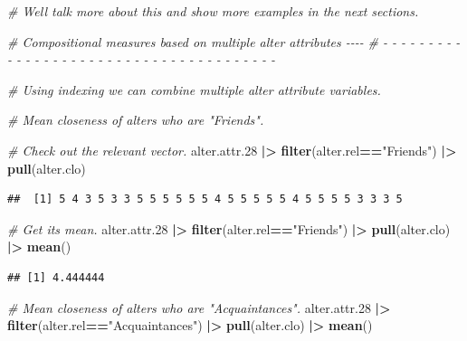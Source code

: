 \documentclass[
]{book}
\newenvironment{Shaded}{\begin{snugshade}}{\end{snugshade}}
\newcommand{\CommentTok}[1]{\textcolor[rgb]{0.56,0.35,0.01}{\textit{#1}}}
\newcommand{\FloatTok}[1]{\textcolor[rgb]{0.00,0.00,0.81}{#1}}
\newcommand{\FunctionTok}[1]{\textcolor[rgb]{0.13,0.29,0.53}{\textbf{#1}}}
\newcommand{\NormalTok}[1]{#1}
\newcommand{\SpecialCharTok}[1]{\textcolor[rgb]{0.81,0.36,0.00}{\textbf{#1}}}
\newcommand{\StringTok}[1]{\textcolor[rgb]{0.31,0.60,0.02}{#1}}
\begin{document}
\begin{Shaded}
\begin{Highlighting}[]
\CommentTok{\# We\textquotesingle{}ll talk more about this and show more examples in the next sections.}


\CommentTok{\# Compositional measures based on multiple alter attributes                 {-}{-}{-}{-}}
\CommentTok{\# {-} {-} {-} {-} {-} {-} {-} {-} {-} {-} {-} {-} {-} {-} {-} {-} {-} {-} {-} {-} {-} {-} {-} {-} {-} {-} {-} {-} {-} {-} {-} {-} {-} {-} {-} {-} {-} {-} {-} }

\CommentTok{\# Using indexing we can combine multiple alter attribute variables.}

\CommentTok{\# Mean closeness of alters who are "Friends".}

\CommentTok{\# Check out the relevant vector.}
\NormalTok{alter.attr}\FloatTok{.28} \SpecialCharTok{|\textgreater{}}
  \FunctionTok{filter}\NormalTok{(alter.rel}\SpecialCharTok{==}\StringTok{"Friends"}\NormalTok{) }\SpecialCharTok{|\textgreater{}}
  \FunctionTok{pull}\NormalTok{(alter.clo)}
\end{Highlighting}
\end{Shaded}

\begin{verbatim}
##  [1] 5 4 3 5 3 3 5 5 5 5 5 5 4 5 5 5 5 5 4 5 5 5 5 3 3 3 5
\end{verbatim}

\begin{Shaded}
\begin{Highlighting}[]
\CommentTok{\# Get its mean.}
\NormalTok{alter.attr}\FloatTok{.28} \SpecialCharTok{|\textgreater{}}
  \FunctionTok{filter}\NormalTok{(alter.rel}\SpecialCharTok{==}\StringTok{"Friends"}\NormalTok{) }\SpecialCharTok{|\textgreater{}}
  \FunctionTok{pull}\NormalTok{(alter.clo) }\SpecialCharTok{|\textgreater{}} 
  \FunctionTok{mean}\NormalTok{()}
\end{Highlighting}
\end{Shaded}

\begin{verbatim}
## [1] 4.444444
\end{verbatim}

\begin{Shaded}
\begin{Highlighting}[]
\CommentTok{\# Mean closeness of alters who are "Acquaintances".}
\NormalTok{alter.attr}\FloatTok{.28} \SpecialCharTok{|\textgreater{}}
  \FunctionTok{filter}\NormalTok{(alter.rel}\SpecialCharTok{==}\StringTok{"Acquaintances"}\NormalTok{) }\SpecialCharTok{|\textgreater{}}
  \FunctionTok{pull}\NormalTok{(alter.clo) }\SpecialCharTok{|\textgreater{}} 
  \FunctionTok{mean}\NormalTok{()}
\end{Highlighting}
\end{Shaded}
\end{document}
